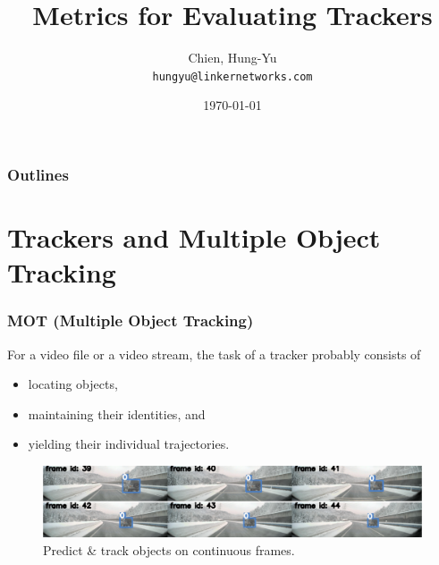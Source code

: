 \documentclass[slidetop, mathserif]{beamer}
\title[Metrics for Tracking]{Metrics for Evaluating Trackers}
\author[chy1010]{Chien, Hung-Yu \\ {\small\tt hungyu@linkernetworks.com}}
\date{\today}
\begin{document}
\begin{frame}
	\titlepage
\end{frame}

\section[Outline]{}
\begin{frame}
	\frametitle{Outlines}
	\tableofcontents
\end{frame}


\section{Trackers and Multiple Object Tracking}

\begin{frame}
	\frametitle{MOT (Multiple Object Tracking)}

	For a video file or a video stream, the task of a tracker probably consists of
	\begin{itemize}
	\item locating objects,
	\item maintaining their identities, and
	\item yielding their individual trajectories.
	\end{itemize}

	\begin{figure}
		\includegraphics[width=.95\textwidth]{pics/track01.png}
		\caption{Predict \& track objects on continuous frames.}
	\end{figure}

\end{frame}
\end{document}
